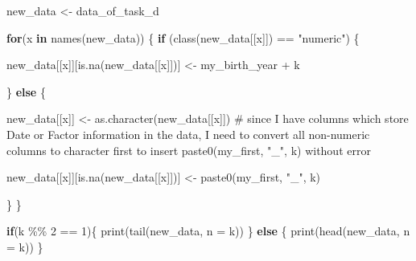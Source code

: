\documentclass[
  letterpaper,
  DIV=11,
  numbers=noendperiod]{scrartcl}
\newenvironment{Shaded}{\begin{snugshade}}{\end{snugshade}}
\newcommand{\AttributeTok}[1]{\textcolor[rgb]{0.40,0.45,0.13}{#1}}
\newcommand{\CommentTok}[1]{\textcolor[rgb]{0.37,0.37,0.37}{#1}}
\newcommand{\ControlFlowTok}[1]{\textcolor[rgb]{0.00,0.23,0.31}{\textbf{#1}}}
\newcommand{\DecValTok}[1]{\textcolor[rgb]{0.68,0.00,0.00}{#1}}
\newcommand{\FunctionTok}[1]{\textcolor[rgb]{0.28,0.35,0.67}{#1}}
\newcommand{\NormalTok}[1]{\textcolor[rgb]{0.00,0.23,0.31}{#1}}
\newcommand{\OtherTok}[1]{\textcolor[rgb]{0.00,0.23,0.31}{#1}}
\newcommand{\SpecialCharTok}[1]{\textcolor[rgb]{0.37,0.37,0.37}{#1}}
\newcommand{\StringTok}[1]{\textcolor[rgb]{0.13,0.47,0.30}{#1}}
\begin{document}
\begin{Shaded}
\begin{Highlighting}[]
\NormalTok{new\_data }\OtherTok{\textless{}{-}}\NormalTok{ data\_of\_task\_d}

\ControlFlowTok{for}\NormalTok{(x }\ControlFlowTok{in} \FunctionTok{names}\NormalTok{(new\_data)) \{}
  \ControlFlowTok{if}\NormalTok{ (}\FunctionTok{class}\NormalTok{(new\_data[[x]]) }\SpecialCharTok{==} \StringTok{"numeric"}\NormalTok{) \{}
    
\NormalTok{    new\_data[[x]][}\FunctionTok{is.na}\NormalTok{(new\_data[[x]])] }\OtherTok{\textless{}{-}}\NormalTok{ my\_birth\_year }\SpecialCharTok{+}\NormalTok{ k}
    
\NormalTok{  \} }\ControlFlowTok{else}\NormalTok{ \{}
    
\NormalTok{    new\_data[[x]] }\OtherTok{\textless{}{-}} \FunctionTok{as.character}\NormalTok{(new\_data[[x]]) }\CommentTok{\# since I have columns which store Date or Factor information in the data, I need to convert all non{-}numeric columns to character first to insert paste0(my\_first, "\_", k) without error}
    
\NormalTok{    new\_data[[x]][}\FunctionTok{is.na}\NormalTok{(new\_data[[x]])] }\OtherTok{\textless{}{-}} \FunctionTok{paste0}\NormalTok{(my\_first, }\StringTok{"\_"}\NormalTok{, k)}
    
\NormalTok{  \}}
\NormalTok{\}}

\ControlFlowTok{if}\NormalTok{(k }\SpecialCharTok{\%\%} \DecValTok{2} \SpecialCharTok{==} \DecValTok{1}\NormalTok{)\{}
  \FunctionTok{print}\NormalTok{(}\FunctionTok{tail}\NormalTok{(new\_data, }\AttributeTok{n =}\NormalTok{ k))}
\NormalTok{\} }\ControlFlowTok{else}\NormalTok{ \{}
  \FunctionTok{print}\NormalTok{(}\FunctionTok{head}\NormalTok{(new\_data, }\AttributeTok{n =}\NormalTok{ k))}
\NormalTok{\}}
\end{Highlighting}
\end{Shaded}
\end{document}
